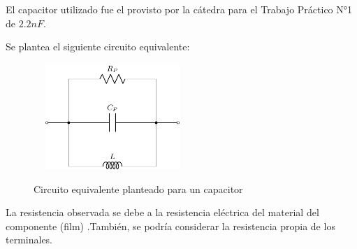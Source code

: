 El capacitor utilizado fue el provisto por la cátedra para el Trabajo Práctico N°1 de $2.2nF$.
\par \par

Se plantea el siguiente circuito equivalente:

\begin{figure}[H]
\centering
\includegraphics[width=6cm,height=4cm]{Ejercicio_1(Germo)/Circuitos/circuito_equivalente_capacitor_todoparalelo.pdf}
\label{fig:circuito_equivalente_capacitor_todoparalelo}
\caption{Circuito equivalente planteado para un capacitor}
\end{figure}
La resistencia observada se debe a la resistencia eléctrica del material del componente (film) .También, se podría considerar la resistencia propia de los terminales. \par

